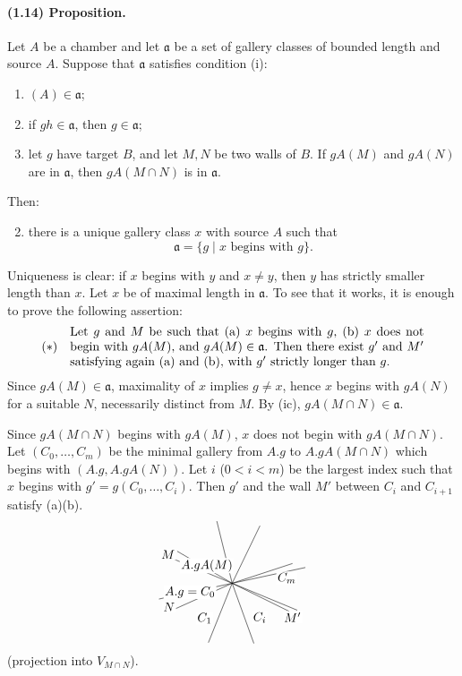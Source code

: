 \documentclass[10pt]{article}
\begin{document}
\paragraph{(1.14) Proposition.} Let $A$ be a chamber and let $\mathfrak a$ be a set of gallery classes of bounded length and source $A$. Suppose that $\mathfrak a$ satisfies condition (i):
\begin{enumerate}[label=(i\alph*)]
\item $(A)\in\mathfrak a$;
\item if $gh\in\mathfrak a$, then $g\in\mathfrak a$;
\item let $g$ have target $B$, and let $M,N$ be two walls of $B$. If $gA(M)$ and $gA(N)$ are in $\mathfrak a$, then $gA(M\cap N)$ is in $\mathfrak a$.
\end{enumerate}
Then:
\begin{enumerate}[label=(\roman*)]
\setcounter{enumi}{1}
\item there is a unique gallery class $x$ with source $A$ such that
\[
\mathfrak a=\{g\mid x\text{ begins with }g\}.
\]
\end{enumerate}
Uniqueness is clear: if $x$ begins with $y$ and $x\ne y$, then $y$ has strictly smaller length than $x$. Let $x$ be of maximal length in $\mathfrak a$. To see that it works, it is enough to prove the following assertion:
\[
(*)\quad
\begin{minipage}{0.82\linewidth}
Let $g$ and $M$ be such that (a) $x$ begins with $g$, (b) $x$ does not begin with $gA(M)$, and $gA(M)\in\mathfrak a$. Then there exist $g'$ and $M'$ satisfying again (a) and (b), with $g'$ strictly longer than $g$.
\end{minipage}
\]
Since $gA(M)\in\mathfrak a$, maximality of $x$ implies $g\ne x$, hence $x$ begins with $gA(N)$ for a suitable $N$, necessarily distinct from $M$. By (ic), $gA(M\cap N)\in\mathfrak a$.

Since $gA(M\cap N)$ begins with $gA(M)$, $x$ does not begin with $gA(M\cap N)$. Let $(C_0,\ldots,C_m)$ be the minimal gallery from $A.g$ to $A.gA(M\cap N)$ which begins with $(A.g,A.gA(N))$. Let $i$ ($0<i<m$) be the largest index such that $x$ begins with $g'=g(C_0,\ldots,C_i)$. Then $g'$ and the wall $M'$ between $C_i$ and $C_{i+1}$ satisfy (a)(b).
\[
\begin{tikzpicture}[scale=0.92,baseline={(0,0)}]
\coordinate (O) at (0,0);
\foreach \a in {18,64,104,150,204,248,290,334}
  {\draw ({1.95*cos(\a)},{1.95*sin(\a)})--(O);}
\draw (-2.25,-0.48)--(2.25,0.48);
\draw (-2.00,0.82)--(2.00,-0.82);
\node[fill=white,inner sep=1pt,above left] at (-1.72,0.70) {$M$};
\node[fill=white,inner sep=1pt,above] at (-0.78,0.30) {$A.gA(M)$};
\node[fill=white,inner sep=1pt,below left] at (-0.48,-0.06) {$A.g=C_0$};
\node[fill=white,inner sep=1pt,right] at (1.35,0.16) {$C_m$};
\node[fill=white,inner sep=1pt,left] at (-1.72,-0.72) {$N$};
\node[fill=white,inner sep=1pt,below left] at (-0.58,-0.86) {$C_1$};
\node[fill=white,inner sep=1pt,below right] at (0.60,-0.84) {$C_i$};
\node[fill=white,inner sep=1pt,right] at (1.55,-1.03) {$M'$};
\end{tikzpicture}
\]
(projection into $V_{M\cap N}$).
\end{document}
